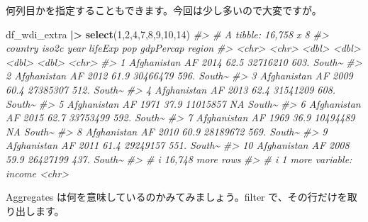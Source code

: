 \documentclass[
  xelatex, ja=standard]{bxjsbook}
\newenvironment{Shaded}{\begin{snugshade}}{\end{snugshade}}
\newcommand{\CommentTok}[1]{\textcolor[rgb]{0.56,0.35,0.01}{\textit{#1}}}
\newcommand{\DecValTok}[1]{\textcolor[rgb]{0.00,0.00,0.81}{#1}}
\newcommand{\FunctionTok}[1]{\textcolor[rgb]{0.13,0.29,0.53}{\textbf{#1}}}
\newcommand{\NormalTok}[1]{#1}
\newcommand{\SpecialCharTok}[1]{\textcolor[rgb]{0.81,0.36,0.00}{\textbf{#1}}}
\theoremstyle{definition}
\theoremstyle{definition}
\theoremstyle{definition}
\theoremstyle{definition}
\theoremstyle{remark}
\begin{document}
何列目かを指定することもできます。今回は少し多いので大変ですが。

\begin{Shaded}
\begin{Highlighting}[]
\NormalTok{df\_wdi\_extra }\SpecialCharTok{|\textgreater{}} \FunctionTok{select}\NormalTok{(}\DecValTok{1}\NormalTok{,}\DecValTok{2}\NormalTok{,}\DecValTok{4}\NormalTok{,}\DecValTok{7}\NormalTok{,}\DecValTok{8}\NormalTok{,}\DecValTok{9}\NormalTok{,}\DecValTok{10}\NormalTok{,}\DecValTok{14}\NormalTok{)}
\CommentTok{\#\textgreater{} \# A tibble: 16,758 x 8}
\CommentTok{\#\textgreater{}    country     iso2c  year lifeExp      pop gdpPercap region}
\CommentTok{\#\textgreater{}    \textless{}chr\textgreater{}       \textless{}chr\textgreater{} \textless{}dbl\textgreater{}   \textless{}dbl\textgreater{}    \textless{}dbl\textgreater{}     \textless{}dbl\textgreater{} \textless{}chr\textgreater{} }
\CommentTok{\#\textgreater{}  1 Afghanistan AF     2014    62.5 32716210      603. South\textasciitilde{}}
\CommentTok{\#\textgreater{}  2 Afghanistan AF     2012    61.9 30466479      596. South\textasciitilde{}}
\CommentTok{\#\textgreater{}  3 Afghanistan AF     2009    60.4 27385307      512. South\textasciitilde{}}
\CommentTok{\#\textgreater{}  4 Afghanistan AF     2013    62.4 31541209      608. South\textasciitilde{}}
\CommentTok{\#\textgreater{}  5 Afghanistan AF     1971    37.9 11015857       NA  South\textasciitilde{}}
\CommentTok{\#\textgreater{}  6 Afghanistan AF     2015    62.7 33753499      592. South\textasciitilde{}}
\CommentTok{\#\textgreater{}  7 Afghanistan AF     1969    36.9 10494489       NA  South\textasciitilde{}}
\CommentTok{\#\textgreater{}  8 Afghanistan AF     2010    60.9 28189672      569. South\textasciitilde{}}
\CommentTok{\#\textgreater{}  9 Afghanistan AF     2011    61.4 29249157      551. South\textasciitilde{}}
\CommentTok{\#\textgreater{} 10 Afghanistan AF     2008    59.9 26427199      437. South\textasciitilde{}}
\CommentTok{\#\textgreater{} \# i 16,748 more rows}
\CommentTok{\#\textgreater{} \# i 1 more variable: income \textless{}chr\textgreater{}}
\end{Highlighting}
\end{Shaded}

Aggregates は何を意味しているのかみてみましょう。filter で、その行だけを取り出します。
\end{document}
